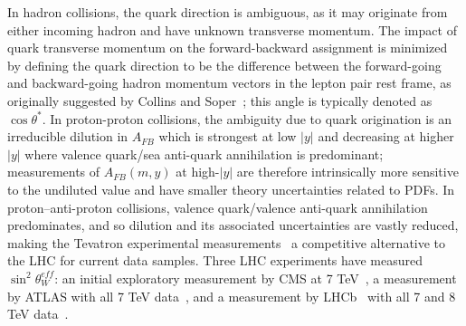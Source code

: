 In hadron collisions, the quark direction is ambiguous, as it may
originate from either incoming hadron and have unknown transverse
momentum. The impact of quark transverse momentum on the
forward-backward assignment is minimized by defining the quark
direction to be the difference between the forward-going and
backward-going hadron momentum vectors in the lepton pair rest frame,
as originally suggested by Collins and Soper~\cite{Collins:1977iv};
this angle is typically denoted as $\cos\theta^*$. In proton-proton
collisions, the ambiguity due to quark origination is an irreducible
dilution in $A_{FB}$ which is strongest at low $|y|$ and decreasing at
higher $|y|$ where valence quark/sea anti-quark annihilation is
predominant; measurements of $A_{FB}(m,y)$ at high-$|y|$ are therefore
intrinsically more sensitive to the undiluted value and have smaller
theory uncertainties related to PDFs.  In proton--anti-proton
collisions, valence quark/valence anti-quark annihilation
predominates, and so dilution and its associated uncertainties are
vastly reduced, making the Tevatron experimental
measurements~\cite{Aaltonen:2016nuy,Aaltonen:2014loa,Abazov:2014jti} a
competitive alternative to the LHC for current data samples. Three LHC
experiments have measured $\sin^2\theta^{eff}_{W}$: an initial
exploratory measurement by CMS at 7 TeV~\cite{Chatrchyan:2011ya}, a
measurement by ATLAS with all 7 TeV data~\cite{Aad:2015uau}, and a
measurement by LHCb~\cite{Alves:2008zz,Aaij:2014jba} with all 7 and 8
TeV data~\cite{Aaij:2015lka}.

